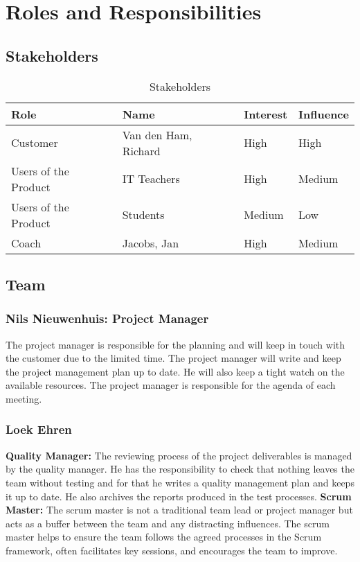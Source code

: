 \section{Roles and Responsibilities}

\subsection{Stakeholders}
\begin{table}[h]
    \centering
    \begin{tabular}{l|l|l|l}
        \textbf{Role}               &   \textbf{Name}           &   \textbf{Interest}     &     \textbf{Influence}  \\ \hline \hline
        Customer                    &   Van den Ham, Richard    &   High                  &     High                \\ \hline
        Users of the Product        &   IT Teachers             &   High                  &     Medium              \\ \hline
        Users of the Product        &   Students                &   Medium                &     Low                 \\ \hline
        Coach                       &   Jacobs, Jan             &   High                  &     Medium              \\ \hline        
    \end{tabular}
    \caption{Stakeholders}
\end{table}

\subsection{Team}
    \subsubsection{Nils Nieuwenhuis: Project Manager}
    The project manager is responsible for the planning
    and will keep in touch with the customer due to the limited time. The project manager will write and
    keep the project management plan up to date. He will also keep a tight watch on the available
    resources. The project manager is responsible for the agenda of each meeting.
    
    \subsubsection{Loek Ehren}
    \textbf{Quality Manager:}
    The reviewing process of the project deliverables is managed by the quality manager. He has the responsibility to check 		that nothing leaves
    the team without testing and for that he writes a quality management plan and keeps it up to date. He also archives the 		reports produced
    in the test processes. 
    \newline
    \newline
    \textbf{Scrum Master:}
    The scrum master is not a traditional team lead or project manager but acts as a buffer between the team and any distracting influences. The scrum master helps to ensure the team follows the agreed processes in the Scrum framework, often facilitates key sessions, and encourages the team to improve.  

